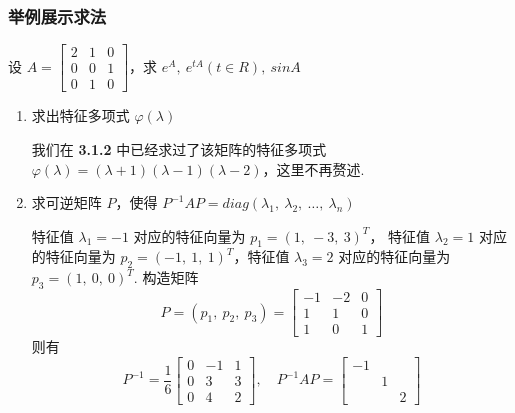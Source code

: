         \subsubsection{举例展示求法}
            \begin{problem}
                \par 设 $A = \begin{bmatrix}
                    2 & 1 & 0 \\ 0 & 0 & 1 \\ 0 & 1 & 0
                \end{bmatrix}$，求 $e^A, \ e^{tA}(t \in R), \ sinA$ 
            \end{problem}
            \begin{solution}
                \begin{enumerate}
                    \item 求出特征多项式 $\varphi(\lambda)$
                        \par 我们在 \textbf{3.1.2} 中已经求过了该矩阵的特征多项式 $\varphi(\lambda) = (\lambda + 1)(\lambda - 1)(\lambda - 2)$，这里不再赘述.
                    \item 求可逆矩阵 $P$，使得 $P^{-1}AP = diag(\lambda_1, \ \lambda_2, \ \dots, \ \lambda_n)$
                        \par 特征值 $\lambda_1 = -1$ 对应的特征向量为 $p_1 = (1, \ -3, \ 3)^T$， 特征值 $\lambda_2 = 1$ 对应的特征向量为 $p_2 = (-1, \ 1, \ 1)^T$，特征值 $\lambda_3 = 2$ 对应的特征向量为 $p_3 = (1, \ 0, \ 0)^T$. 构造矩阵
                        \begin{equation*}
                            P = (p_1, \ p_2, \ p_3) = \begin{bmatrix}
                                -1 & -2 & 0 \\ 1 & 1 & 0 \\ 1 & 0 & 1
                            \end{bmatrix}
                        \end{equation*}
                        则有 
                        \begin{equation*}
                            P^{-1} = \frac{1}{6}\begin{bmatrix}
                                0 & -1 & 1 \\ 0 & 3 & 3 \\ 0 & 4 & 2
                            \end{bmatrix}, \quad P^{-1}AP = \begin{bmatrix}
                                -1 & & \\ & 1 & \\ & & 2 

\end{bmatrix}
\end{equation*}
\end{enumerate}
\end{solution}
